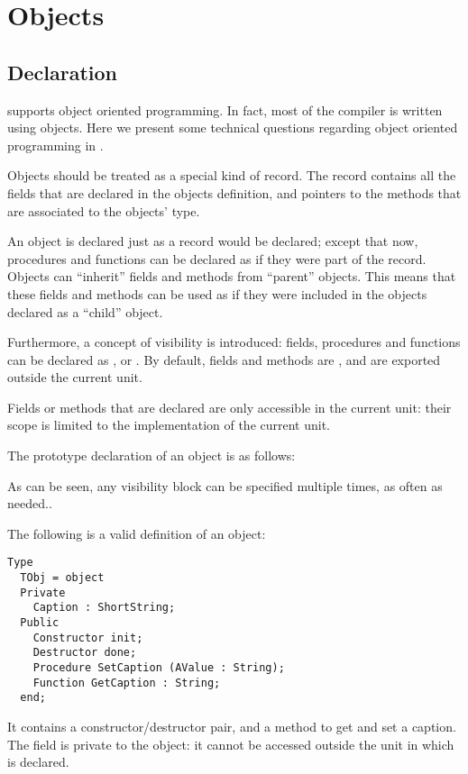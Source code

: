 \chapter{Objects}
\label{ch:Objects}

\section{Declaration}
\fpc supports object oriented programming. In fact, most  of the compiler is
written using objects. Here we present some technical questions regarding
object oriented programming in \fpc.

Objects should be treated as a special kind of record. The record contains
all the fields that are declared in the objects definition, and pointers
to the methods that are associated to the objects' type.

An object is declared just as a record would be declared; except that
now, procedures and functions can be declared as if they were part of the record.
Objects can ``inherit'' fields and methods from ``parent'' objects. This means
that these fields and methods can be used as if they were included in the
objects declared as a ``child'' object.

Furthermore, a concept of visibility  is introduced:
fields, procedures and functions can be declared as ,
 or
. By default, fields and methods are , and
are exported outside the current unit.

Fields or methods that are declared  are only accessible
in the current unit: their scope is limited to the implementation of the
current unit.

The prototype declaration of an object is as follows:

As can be seen, any visibility block can be specified multiple times, as
often as needed..

The following is a valid definition of an object:
\begin{verbatim}
Type
  TObj = object
  Private
    Caption : ShortString;
  Public
    Constructor init;
    Destructor done;
    Procedure SetCaption (AValue : String);
    Function GetCaption : String;
  end;
\end{verbatim}
It contains a constructor/destructor pair, and a method to get and set a
caption. The  field is private to the object: it cannot be accessed
outside the unit in which  is declared.

